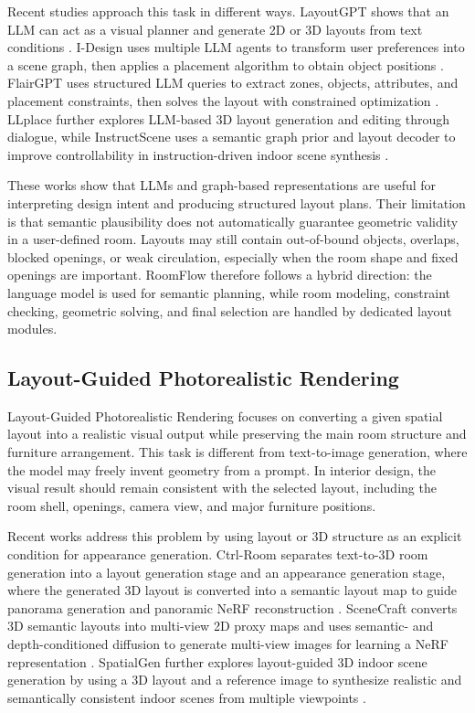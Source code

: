 Recent studies approach this task in different ways. LayoutGPT shows that an LLM can act as a visual planner and generate 2D or 3D layouts from text conditions \cite{al2023LayoutgptCompositionalVisual}. I-Design uses multiple LLM agents to transform user preferences into a scene graph, then applies a placement algorithm to obtain object positions \cite{al2024IDesignPersonalized}. FlairGPT uses structured LLM queries to extract zones, objects, attributes, and placement constraints, then solves the layout with constrained optimization \cite{Littlefair2025FlairgptRepurposingLlms}. LLplace further explores LLM-based 3D layout generation and editing through dialogue, while InstructScene uses a semantic graph prior and layout decoder to improve controllability in instruction-driven indoor scene synthesis \cite{yang2024llplace,lin2024instructscene}.

These works show that LLMs and graph-based representations are useful for interpreting design intent and producing structured layout plans. Their limitation is that semantic plausibility does not automatically guarantee geometric validity in a user-defined room. Layouts may still contain out-of-bound objects, overlaps, blocked openings, or weak circulation, especially when the room shape and fixed openings are important. RoomFlow therefore follows a hybrid direction: the language model is used for semantic planning, while room modeling, constraint checking, geometric solving, and final selection are handled by dedicated layout modules.

\subsection{Layout-Guided Photorealistic Rendering}\label{subsec:interior-image-generation-and-editing-survey}

Layout-Guided Photorealistic Rendering focuses on converting a given spatial layout into a realistic visual output while preserving the main room structure and furniture arrangement. This task is different from text-to-image generation, where the model may freely invent geometry from a prompt. In interior design, the visual result should remain consistent with the selected layout, including the room shell, openings, camera view, and major furniture positions.

Recent works address this problem by using layout or 3D structure as an explicit condition for appearance generation. Ctrl-Room separates text-to-3D room generation into a layout generation stage and an appearance generation stage, where the generated 3D layout is converted into a semantic layout map to guide panorama generation and panoramic NeRF reconstruction \cite{al2025CtrlRoomControllable}. SceneCraft converts 3D semantic layouts into multi-view 2D proxy maps and uses semantic- and depth-conditioned diffusion to generate multi-view images for learning a NeRF representation \cite{yang2024scenecraft}. SpatialGen further explores layout-guided 3D indoor scene generation by using a 3D layout and a reference image to synthesize realistic and semantically consistent indoor scenes from multiple viewpoints \cite{fang2025spatialgen}.

